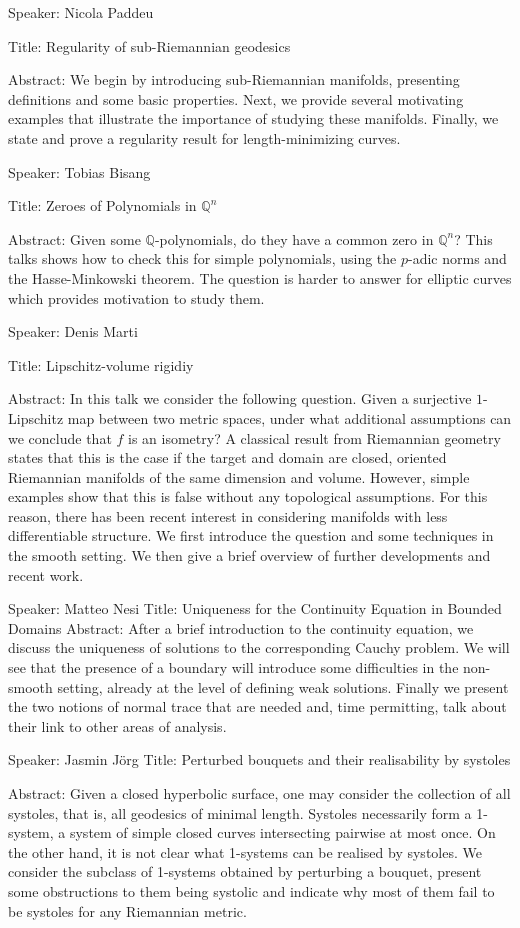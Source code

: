 Speaker: Nicola Paddeu

Title: Regularity of sub-Riemannian geodesics

Abstract: We begin by introducing sub-Riemannian manifolds, presenting definitions and some basic properties. Next, we provide several motivating examples that illustrate the importance of studying these manifolds. Finally, we state and prove a regularity result for length-minimizing curves.


Speaker: Tobias Bisang

Title: Zeroes of Polynomials in $\mathbb{Q}^n$

Abstract: Given some $\mathbb{Q}$-polynomials, do they have a common zero in $\mathbb{Q}^n$? This talks shows how to check this for simple polynomials, using the $p$-adic norms and the Hasse-Minkowski theorem. The question is harder to answer for elliptic curves which provides motivation to study them.


Speaker: Denis Marti

Title: Lipschitz-volume rigidiy

Abstract: In this talk we consider the following question. Given a surjective $1$-Lipschitz map between two metric spaces, under what additional assumptions can we conclude that $f$ is an isometry? A classical result from Riemannian geometry states that this is the case if the target and domain are closed, oriented Riemannian manifolds of the same dimension and volume. However, simple examples show that this is false without any topological assumptions. For this reason, there has been recent interest in considering manifolds with less differentiable structure.
We first introduce the question and some techniques in the smooth setting. We then give a brief overview of further developments and recent work.


Speaker: Matteo Nesi
Title: Uniqueness for the Continuity Equation in Bounded Domains
Abstract: After a brief introduction to the continuity equation, we discuss the uniqueness of solutions to the corresponding Cauchy problem. We will see that the presence of a boundary will introduce some difficulties in the non-smooth setting, already at the level of defining weak solutions. 
Finally we present the two notions of normal trace that are needed and, time permitting, talk about their link to other areas of analysis.


Speaker: Jasmin Jörg
Title: Perturbed bouquets and their realisability by systoles

Abstract: Given a closed hyperbolic surface, one may consider the collection of all systoles, that is, all geodesics of minimal length. Systoles necessarily form a 1-system, a system of simple closed curves intersecting pairwise at most once. On the other hand, it is not clear what 1-systems can be realised by systoles. We consider the subclass of 1-systems obtained by perturbing a bouquet, present some obstructions to them being systolic and indicate why most of them fail to be systoles for any Riemannian metric.

